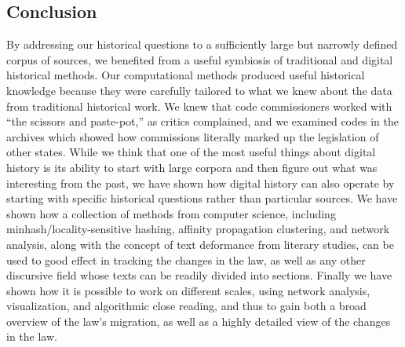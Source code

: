 \documentclass[12pt,]{article}
\begin{document}
\hypertarget{conclusion}{%
\subsection{Conclusion}\label{conclusion}}

By addressing our historical questions to a sufficiently large but
narrowly defined corpus of sources, we benefited from a useful symbiosis
of traditional and digital historical methods. Our computational methods
produced useful historical knowledge because they were carefully
tailored to what we knew about the data from traditional historical
work. We knew that code commissioners worked with ``the scissors and
paste-pot,'' as critics complained, and we examined codes in the
archives which showed how commissions literally marked up the
legislation of other states. While we think that one of the most useful
things about digital history is its ability to start with large corpora
and then figure out what was interesting from the past, we have shown
how digital history can also operate by starting with specific
historical questions rather than particular sources. We have shown how a
collection of methods from computer science, including
minhash/locality-sensitive hashing, affinity propagation clustering, and
network analysis, along with the concept of text deformance from
literary studies, can be used to good effect in tracking the changes in
the law, as well as any other discursive field whose texts can be
readily divided into sections. Finally we have shown how it is possible
to work on different scales, using network analysis, visualization, and
algorithmic close reading, and thus to gain both a broad overview of the
law's migration, as well as a highly detailed view of the changes in the
law.
\end{document}
